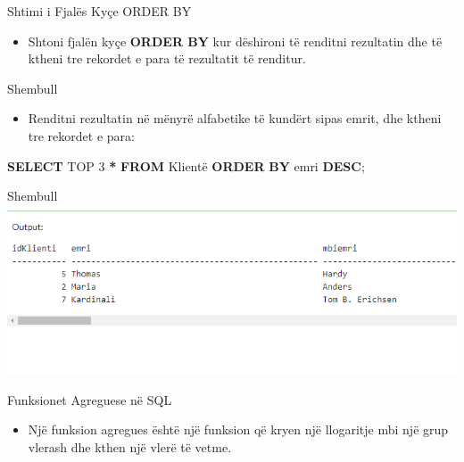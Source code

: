 \documentclass[
  ignorenonframetext,
]{beamer}
\newenvironment{Shaded}{\begin{snugshade}}{\end{snugshade}}
\newcommand{\DecValTok}[1]{\textcolor[rgb]{0.00,0.00,0.81}{#1}}
\newcommand{\KeywordTok}[1]{\textcolor[rgb]{0.13,0.29,0.53}{\textbf{#1}}}
\newcommand{\NormalTok}[1]{#1}
\newcommand{\OperatorTok}[1]{\textcolor[rgb]{0.81,0.36,0.00}{\textbf{#1}}}
\providecommand{\tightlist}{%
  \setlength{\itemsep}{0pt}\setlength{\parskip}{0pt}}
\begin{document}
\begin{frame}{Shtimi i Fjalës Kyçe ORDER BY}
\label{shtimi-i-fjaluxebs-kyuxe7e-order-by}
\begin{itemize}
\tightlist
\item
  Shtoni fjalën kyçe \textbf{ORDER BY} kur dëshironi të renditni
  rezultatin dhe të ktheni tre rekordet e para të rezultatit të
  renditur.
\end{itemize}
\end{frame}

\begin{frame}[fragile]{Shembull}
\label{shembull-17}
\begin{itemize}
\tightlist
\item
  Renditni rezultatin në mënyrë alfabetike të kundërt sipas emrit, dhe
  ktheni tre rekordet e para:
\end{itemize}


\begin{Shaded}
\begin{Highlighting}[]
\KeywordTok{SELECT}\NormalTok{ TOP }\DecValTok{3} \OperatorTok{*} \KeywordTok{FROM}\NormalTok{ Klientë}
\KeywordTok{ORDER} \KeywordTok{BY}\NormalTok{ emri }\KeywordTok{DESC}\NormalTok{;}
\end{Highlighting}
\end{Shaded}
\end{frame}

\begin{frame}{Shembull}
\label{shembull-18}
\includegraphics{./Figs/query42.png}
\end{frame}

\begin{frame}{Funksionet Agreguese në SQL}
\label{funksionet-agreguese-nuxeb-sql}
\begin{itemize}
\tightlist
\item
  Një funksion agregues është një funksion që kryen një llogaritje mbi
  një grup vlerash dhe kthen një vlerë të vetme.
\end{itemize}
\end{frame}
\end{document}
